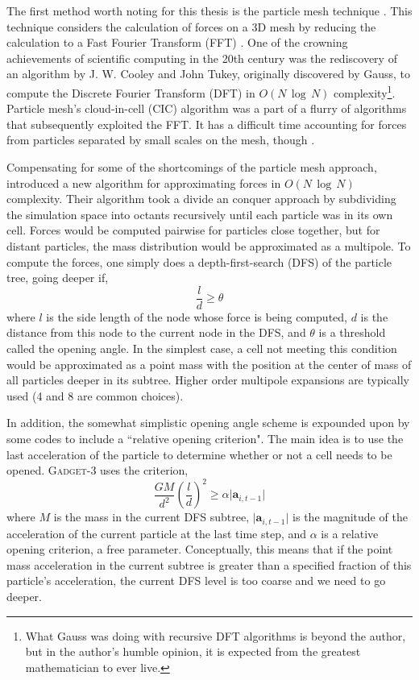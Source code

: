 The first method worth noting for this thesis is the particle mesh technique \citep{hockney_pm, white_pm, klypin_pm}. This technique considers the calculation of forces on a 3D mesh by reducing the calculation to a Fast Fourier Transform (FFT) \citep{numerical_recipes_fortran}. One of the crowning achievements of scientific computing in the 20th century was the rediscovery of an algorithm by J. W. Cooley and John Tukey, originally discovered by Gauss, to compute the Discrete Fourier Transform (DFT) in $O(N\,\log\,N)$ complexity\footnote{What Gauss was doing with recursive DFT algorithms is beyond the author, but in the author's humble opinion, it is expected from the greatest mathematician to ever live.}\citep{fft}. Particle mesh's cloud-in-cell (CIC) algorithm was a part of a flurry of algorithms that subsequently exploited the FFT. It has a difficult time accounting for forces from particles separated by small scales on the mesh, though \citep{GadgetCodePaper}.

Compensating for some of the shortcomings of the particle mesh approach, \citet{barnes_hut} introduced a new algorithm for approximating forces in $O(N \,\log\, N)$ complexity. Their algorithm took a divide an conquer approach by subdividing the simulation space into octants recursively until each particle was in its own cell. Forces would be computed pairwise for particles close together, but for distant particles, the mass distribution would be approximated as a multipole. To compute the forces, one simply does a depth-first-search (DFS) of the particle tree, going deeper if,
\begin{equation}
\frac{l}{d} \geq \theta
\end{equation}
where $l$ is the side length of the node whose force is being computed, $d$ is the distance from this node to the current node in the DFS, and $\theta$ is a threshold called the opening angle. In the simplest case, a cell not meeting this condition would be approximated as a point mass with the position at the  center of mass of all particles deeper in its subtree. Higher order multipole expansions are typically used (4 and 8 are common choices).

In addition, the somewhat simplistic opening angle scheme is expounded upon by some codes to include a ``relative opening criterion". The main idea is to use the last acceleration of the particle to determine whether or not a cell needs to be opened. \textsc{Gadget-3} uses the criterion,
\begin{equation}
\frac{G M}{d^2} \left(\frac{l}{d}\right)^2 \geq \alpha \vert\textbf{a}_{i,t-1} \vert
\end{equation}
where $M$ is the mass in the current DFS subtree, $\vert\textbf{a}_{i,t-1} \vert$ is the magnitude of the acceleration of the current particle at the last time step, and $\alpha$ is a relative opening criterion, a free parameter. Conceptually, this means that if the point mass acceleration in the current subtree is greater than a specified fraction of this particle's acceleration, the current DFS level is too coarse and we need to go deeper.

